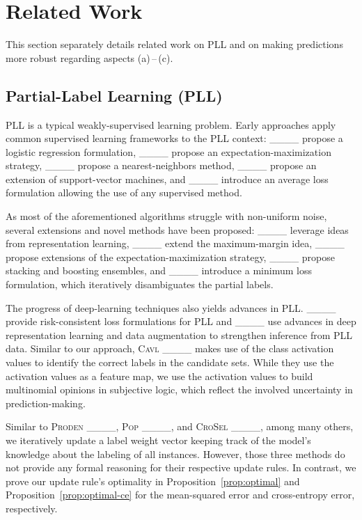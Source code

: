 \section{Related Work}
\label{sec:related-work}
This section separately details related work on PLL and on making predictions more robust regarding aspects (a)\,--\,(c).

\subsection{Partial-Label Learning (PLL)}
PLL is a typical weakly-supervised learning problem.
Early approaches apply common supervised learning frameworks to the PLL context:
____ propose a logistic regression formulation,
____ propose an expectation-maximization strategy,
____ propose a nearest-neighbors method,
____ propose an extension of support-vector machines,
and ____ introduce an average loss formulation allowing the use of any supervised method.

As most of the aforementioned algorithms struggle with non-uniform noise, several extensions and novel methods have been proposed:
____ leverage ideas from representation learning,
____ extend the maximum-margin idea,
____ propose extensions of the expectation-maximization strategy,
____ propose stacking and boosting ensembles,
and ____ introduce a minimum loss formulation, which iteratively disambiguates the partial labels.

The progress of deep-learning techniques also yields advances in PLL.
____ provide risk-consistent loss formulations for PLL and ____ use advances in deep representation learning and data augmentation to strengthen inference from PLL data.
Similar to our approach, \textsc{Cavl} ____ makes use of the class activation values to identify the correct labels in the candidate sets.
While they use the activation values as a feature map, we use the activation values to build multinomial opinions in subjective logic, which reflect the involved uncertainty in prediction-making.

Similar to \textsc{Proden} ____, \textsc{Pop} ____, and \textsc{CroSel} ____, among many others, we iteratively update a label weight vector keeping track of the model's knowledge about the labeling of all instances.
However, those three methods do not provide any formal reasoning for their respective update rules.
In contrast, we prove our update rule's optimality in Proposition~\ref{prop:optimal} and Proposition~\ref{prop:optimal-ce} for the mean-squared error and cross-entropy error, respectively.

